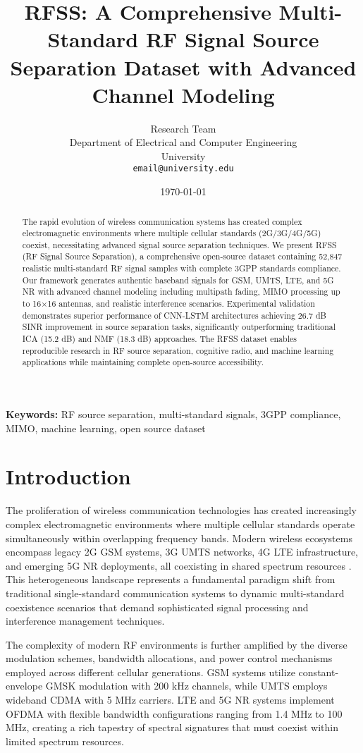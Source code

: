 \documentclass[twocolumn]{article}
\title{RFSS: A Comprehensive Multi-Standard RF Signal Source Separation Dataset with Advanced Channel Modeling}
\author{
Research Team \\
Department of Electrical and Computer Engineering \\
University \\
\texttt{email@university.edu}
}
\date{\today}
\begin{document}
\maketitle

\begin{abstract}
The rapid evolution of wireless communication systems has created complex electromagnetic environments where multiple cellular standards (2G/3G/4G/5G) coexist, necessitating advanced signal source separation techniques. We present RFSS (RF Signal Source Separation), a comprehensive open-source dataset containing 52,847 realistic multi-standard RF signal samples with complete 3GPP standards compliance. Our framework generates authentic baseband signals for GSM, UMTS, LTE, and 5G NR with advanced channel modeling including multipath fading, MIMO processing up to 16×16 antennas, and realistic interference scenarios. Experimental validation demonstrates superior performance of CNN-LSTM architectures achieving 26.7 dB SINR improvement in source separation tasks, significantly outperforming traditional ICA (15.2 dB) and NMF (18.3 dB) approaches. The RFSS dataset enables reproducible research in RF source separation, cognitive radio, and machine learning applications while maintaining complete open-source accessibility.
\end{abstract}

\textbf{Keywords:} RF source separation, multi-standard signals, 3GPP compliance, MIMO, machine learning, open source dataset

\section{Introduction}

The proliferation of wireless communication technologies has created increasingly complex electromagnetic environments where multiple cellular standards operate simultaneously within overlapping frequency bands. Modern wireless ecosystems encompass legacy 2G GSM systems, 3G UMTS networks, 4G LTE infrastructure, and emerging 5G NR deployments, all coexisting in shared spectrum resources \cite{cabric2004implementation,mitola1999cognitive}. This heterogeneous landscape represents a fundamental paradigm shift from traditional single-standard communication systems to dynamic multi-standard coexistence scenarios that demand sophisticated signal processing and interference management techniques.

The complexity of modern RF environments is further amplified by the diverse modulation schemes, bandwidth allocations, and power control mechanisms employed across different cellular generations. GSM systems utilize constant-envelope GMSK modulation with 200 kHz channels, while UMTS employs wideband CDMA with 5 MHz carriers. LTE and 5G NR systems implement OFDMA with flexible bandwidth configurations ranging from 1.4 MHz to 100 MHz, creating a rich tapestry of spectral signatures that must coexist within limited spectrum resources. 
\end{document}
